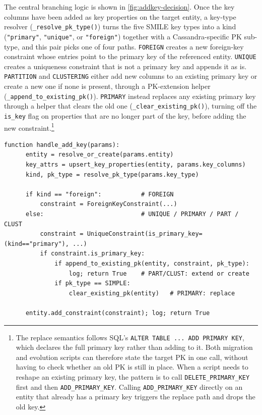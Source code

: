 The central branching logic is shown in \autoref{fig:addkey-decision}.
  Once the key columns have been added as key properties on the target            entity, a key-type resolver (\texttt{\_resolve\_pk\_type()}) turns the
  five SMILE  key types into a kind (\texttt{"primary"}, \texttt{"unique"},
  or \texttt{"foreign"}) together with a Cassandra-specific PK sub-type,
  and this pair picks one of four paths. \texttt{FOREIGN} creates a new         foreign-key constraint whose entries point to the primary key of the
  referenced entity. \texttt{UNIQUE} creates a uniqueness constraint that
  is not a primary key and appends it as is. \texttt{PARTITION} and
  \texttt{CLUSTERING} either add new columns to an existing primary key
  or create a new one if none is present, through a PK-extension helper
  (\texttt{\_append\_to\_existing\_pk()}). \texttt{PRIMARY} instead
  replaces any existing primary key through a helper that clears the old
  one (\texttt{\_clear\_existing\_pk()}), turning off the \texttt{is\_key}
  flag on properties that are no longer part of the key, before adding
  the new constraint.\footnote{%
  The replace semantics follows SQL's \texttt{ALTER TABLE ... ADD PRIMARY
  KEY}, which declares the full primary key rather than adding to it.
  Both migration and evolution scripts can therefore state the target PK
  in one call, without having to check whether an old PK is still in
  place. When a script needs to reshape an existing primary key, the
  pattern is to call \texttt{DELETE\_PRIMARY\_KEY} first and then
  \texttt{ADD\_PRIMARY\_KEY}. Calling \texttt{ADD\_PRIMARY\_KEY} directly
  on an entity that already has a primary key triggers the replace path
  and drops the old key.}

  \begin{lstlisting}[basicstyle=\small\ttfamily,
    caption={Algorithm of the ADD KEY handler},
    label={alg:addkey-handler}]
  function handle_add_key(params):
      entity = resolve_or_create(params.entity)
      key_attrs = upsert_key_properties(entity, params.key_columns)
      kind, pk_type = resolve_pk_type(params.key_type)

      if kind == "foreign":           # FOREIGN
          constraint = ForeignKeyConstraint(...)
      else:                           # UNIQUE / PRIMARY / PART / CLUST
          constraint = UniqueConstraint(is_primary_key=(kind=="primary"), ...)
          if constraint.is_primary_key:
              if append_to_existing_pk(entity, constraint, pk_type):
                  log; return True    # PART/CLUST: extend or create
              if pk_type == SIMPLE:
                  clear_existing_pk(entity)   # PRIMARY: replace

      entity.add_constraint(constraint); log; return True
  \end{lstlisting}


